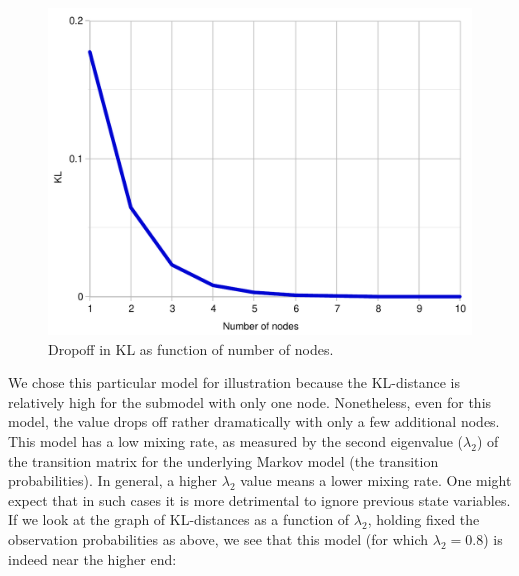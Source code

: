 \documentclass[10pt,letterpaper]{article}
\begin{document}
 \begin{figure}[h]  \begin{center}
\includegraphics[scale=0.3]{hmm1.pdf} \caption{Dropoff in KL as function of number of nodes.} \end{center} 
\label{hmm}\end{figure} 
We chose this particular model for illustration because the KL-distance is relatively high for the submodel with only one node. Nonetheless, even for this model, the value drops off rather dramatically with only a few additional nodes. This model has a low mixing rate, as measured by the second eigenvalue ($\lambda_2$) of the transition matrix for the underlying Markov model (the transition probabilities). In general, a higher $\lambda_2$ value means a lower mixing rate. One might expect that in such cases it is more detrimental to ignore previous state variables. If we look at the graph of KL-distances as a function of $\lambda_2$, holding fixed the observation probabilities as above, we see that this model (for which $\lambda_2 = 0.8$) is indeed near the higher end:
\end{document}
